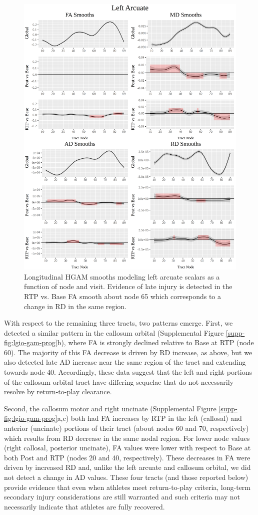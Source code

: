 \documentclass[12pt]{article}
\begin{document}
\begin{figure}[H]
	\centering
	\includegraphics[width=.8\linewidth]{fit_LGIO_lArc.png}
	\caption{Longitudinal HGAM smooths modeling left arcuate scalars as a function of node and visit. Evidence of late injury is detected in the RTP vs. Base FA smooth about node 65 which corresponds to a change in RD in the same region.}
	\label{fig:lgio-gam-prog}
\end{figure}

With respect to the remaining three tracts, two patterns emerge. First, we detected a similar pattern in the callosum orbital (Supplemental Figure \ref{supp-fig:lgio-gam-prog}b), where FA is strongly declined relative to Base at RTP (node 60). The majority of this FA decrease is driven by RD increase, as above, but we also detected late AD increase near the same region of the tract and extending towards node 40. Accordingly, these data suggest that the left and right portions of the callosum orbital tract have differing sequelae that do not necessarily resolve by return-to-play clearance.

Second, the callosum motor and right uncinate (Supplemental Figure \ref{supp-fig:lgio-gam-prog}a,c) both had FA increases by RTP in the left (callosal) and anterior (uncinate) portions of their tract (about nodes 60 and 70, respectively) which results from RD decrease in the same nodal region. For lower node values (right callosal, posterior uncinate), FA values were lower with respect to Base at both Post and RTP (nodes 20 and 40, respectively). These decreases in FA were driven by increased RD and, unlike the left arcuate and callosum orbital, we did not detect a change in AD values. These four tracts (and those reported below) provide evidence that even when athletes meet return-to-play criteria, long-term secondary injury considerations are still warranted and such criteria may not necessarily indicate that athletes are fully recovered.
\end{document}
